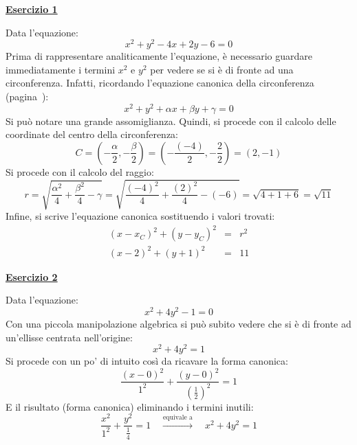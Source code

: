 \documentclass[a4paper]{article}
\newcommand{\example}[1]{\textcolor{Green4}{\textbf{#1}}}
\begin{document}
	\begin{flushleft}
		\example{\underline{Esercizio 1}}
	\end{flushleft}
	
	\noindent
	Data l'equazione:
	\begin{equation*}
		x^{2} + y^{2} - 4x + 2y - 6 = 0
	\end{equation*}
	Prima di rappresentare analiticamente l'equazione, è necessario guardare immediatamente i termini $x^{2}$ e $y^{2}$ per vedere se si è di fronte ad una circonferenza. Infatti, ricordando l'equazione canonica della circonferenza (pagina~\pageref{subsubsection: circonferenza}):
	\begin{equation*}
		x^{2} + y^{2} + \alpha x + \beta y + \gamma = 0
	\end{equation*}
	Si può notare una grande assomiglianza. Quindi, si procede con il calcolo delle coordinate del centro della circonferenza:
	\begin{equation*}
		C = \left(-\dfrac{\alpha}{2}, -\dfrac{\beta}{2}\right) = \left(-\dfrac{\left(-4\right)}{2}, -\dfrac{2}{2}\right) = \left(2, -1\right)
	\end{equation*}
	Si procede con il calcolo del raggio:
	\begin{equation*}
		r = \sqrt{\dfrac{\alpha^{2}}{4} + \dfrac{\beta^{2}}{4} - \gamma} = \sqrt{\dfrac{\left(-4\right)^{2}}{4} + \dfrac{\left(2\right)^{2}}{4} - \left(-6\right)} = \sqrt{4 + 1 + 6} = \sqrt{11}
	\end{equation*}
	Infine, si scrive l'equazione canonica sostituendo i valori trovati:
	\begin{equation*}
		\begin{array}{rcl}
			\left(x-x_{C}\right)^{2} + \left(y-y_{C}\right)^{2} &=& r^{2} \\ [1em]
			\left(x-2\right)^{2} + \left(y+1\right)^{2} &=& 11
		\end{array}
	\end{equation*}
	
	\begin{flushleft}
		\example{\underline{Esercizio 2}}
	\end{flushleft}
	
	\noindent
	Data l'equazione:
	\begin{equation*}
		x^{2} + 4y^{2} - 1 = 0
	\end{equation*}
	Con una piccola manipolazione algebrica si può subito vedere che si è di fronte ad un'ellisse centrata nell'origine:
	\begin{equation*}
		x^{2} + 4y^{2} = 1
	\end{equation*}
	Si procede con un po' di intuito così da ricavare la forma canonica:
	\begin{equation*}
		\dfrac{\left(x-0\right)^{2}}{1^{2}} + \dfrac{\left(y-0\right)^{2}}{\left(\frac{1}{2}\right)^{2}} = 1
	\end{equation*}
	E il risultato (forma canonica) eliminando i termini inutili:
	\begin{equation*}
		\dfrac{x^{2}}{1^{2}} + \dfrac{y^{2}}{\frac{1}{4}} = 1 \hspace{1em} \xrightarrow{\text{equivale a}} \hspace{1em} x^{2} + 4y^{2} = 1
	\end{equation*}\newpage
	
\end{document}

